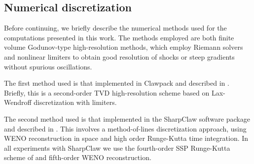 \subsection{Numerical discretization\label{discretization}}
Before continuing, we briefly describe the numerical methods used for the
computations presented in this work.  The methods employed are both
finite volume Godunov-type
high-resolution methods, which employ Riemann solvers and nonlinear limiters
to obtain good resolution of shocks or steep gradients without spurious
oscillations.  

The first method used is that implemented in Clawpack \cite{clawpack45}
and described in \cite{leveque1997}.  Briefly, this is a second-order TVD
high-resolution scheme based on Lax-Wendroff discretization with limiters.

The second method used is that implemented in the SharpClaw software package
\cite{sharpclaw} and described in \cite{ketcheson2006,ketcheson2011}.  
This involves a method-of-lines
discretization approach, using WENO reconstruction in space and high order
Runge-Kutta time integration.  In all experiments with SharpClaw we use the
fourth-order SSP Runge-Kutta scheme of \cite{ketcheson2008} and fifth-order 
WENO reconstruction.
